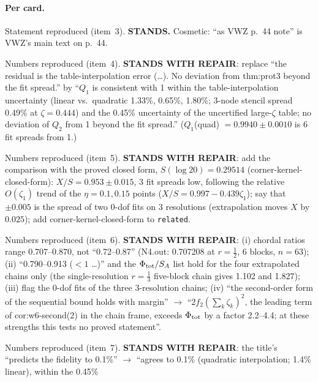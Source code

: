 \documentclass[11pt]{article}
\begin{document}
\paragraph{Per card.}
\begin{description}[leftmargin=1em,style=nextline]
\item[lattice-vwz-1b-equals-1a] Statement reproduced (item~3). \textbf{STANDS.} Cosmetic: ``as VWZ p.~44 note''
 is VWZ's main text on p.~44.
\item[lattice-protocol3-equals-theorem-a] Numbers reproduced (item~4). \textbf{STANDS WITH REPAIR}: replace
 ``the residual is the table-interpolation error (\ldots). No deviation from thm:prot3 beyond the fit spread.'' by
 ``$Q_1$ is consistent with 1 within the table-interpolation uncertainty (linear vs.\ quadratic 1.33\%, 0.65\%, 1.80\%;
 3-node stencil spread 0.49\% at $\zeta=0.444$) and the 0.45\% uncertainty of the uncertified large-$\zeta$ table;
 no deviation of $Q_2$ from 1 beyond the fit spread.'' ($Q_1$(quad) $=0.9940\pm0.0010$ is 6 fit spreads from 1.)
\item[lattice-vwz-protocol-ratios] Numbers reproduced (item~5). \textbf{STANDS WITH REPAIR}: add the comparison with
 the proved closed form, $S(\log20)=0.29514$ (corner-kernel-closed-form): $X/S=0.953\pm0.015$, 3 fit spreads low,
 following the relative $O(\zeta_1)$ trend of the $\eta=0.1,0.15$ points ($X/S=0.997-0.439\zeta_1$); say that
 $\pm0.005$ is the spread of two 0-dof fits on 3 resolutions (extrapolation moves $X$ by $0.025$); add
 corner-kernel-closed-form to \texttt{related}.
\item[lattice-lr-chains-cross-terms] Numbers reproduced (item~6). \textbf{STANDS WITH REPAIR}: (i) chordal ratios
 range $0.707$--$0.870$, not ``0.72--0.87'' (N4.out: 0.707208 at $r=\frac12$, 6 blocks, $n=63$); (ii) ``0.790--0.913
 ($<1$ \ldots)'' and the $\Phi_{\rm tot}/S_A$ list hold for the four extrapolated chains only (the single-resolution
 $r=\frac13$ five-block chain gives 1.102 and 1.827); (iii) flag the 0-dof fits of the three 3-resolution chains;
 (iv) ``the second-order form of the sequential bound holds with margin'' $\to$ ``$2f_2(\sum_k\zeta_k)^2$, the leading
 term of cor:w6-second(2) in the chain frame, exceeds $\Phi_{\rm tot}$ by a factor 2.2--4.4; at these strengths this
 tests no proved statement''.
\item[lattice-general-rule-where-h-fails] Numbers reproduced (item~7). \textbf{STANDS WITH REPAIR}: the title's
 ``predicts the fidelity to 0.1\%'' $\to$ ``agrees to 0.1\% (quadratic interpolation; 1.4\% linear), within the 0.45\%

\end{description}
\end{document}
